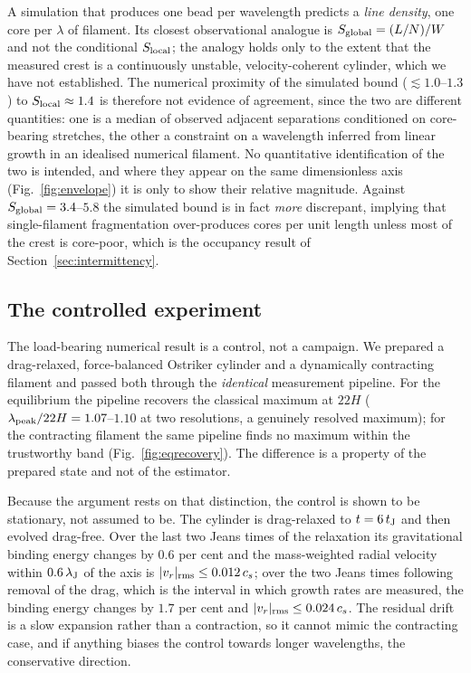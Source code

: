 \documentclass[usenatbib,twoside,twocolumn]{mnras}
\begin{document}
A simulation that produces one bead per wavelength predicts a \emph{line density}, one core per $\lambda$ of filament. Its closest observational analogue is $S_{\rm global}=(L/N)/W$ and not the conditional $S_{\rm local}$; the analogy holds only to the extent that the measured crest is a continuously unstable, velocity-coherent cylinder, which we have not established. The numerical proximity of the simulated bound ($\lesssim1.0$--$1.3$) to $S_{\rm local}\approx1.4$ is therefore not evidence of agreement, since the two are different quantities: one is a median of observed adjacent separations conditioned on core-bearing stretches, the other a constraint on a wavelength inferred from linear growth in an idealised numerical filament. No quantitative identification of the two is intended, and where they appear on the same dimensionless axis (Fig.~\ref{fig:envelope}) it is only to show their relative magnitude. Against $S_{\rm global}=3.4$--$5.8$ the simulated bound is in fact \emph{more} discrepant, implying that single-filament fragmentation over-produces cores per unit length unless most of the crest is core-poor, which is the occupancy result of Section~\ref{sec:intermittency}.

\subsection{The controlled experiment}
\label{sec:control}

The load-bearing numerical result is a control, not a campaign. We prepared a drag-relaxed, force-balanced Ostriker cylinder and a dynamically contracting filament and passed both through the \emph{identical} measurement pipeline. For the equilibrium the pipeline recovers the classical maximum at $22H$ ($\lambda_{\rm peak}/22H=1.07$--$1.10$ at two resolutions, a genuinely resolved maximum); for the contracting filament the same pipeline finds no maximum within the trustworthy band (Fig.~\ref{fig:eqrecovery}). The difference is a property of the prepared state and not of the estimator.

Because the argument rests on that distinction, the control is shown to be stationary, not assumed to be. The cylinder is drag-relaxed to $t=6\,t_{\rm J}$ and then evolved drag-free. Over the last two Jeans times of the relaxation its gravitational binding energy changes by $0.6$ per cent and the mass-weighted radial velocity within $0.6\,\lambda_{\rm J}$ of the axis is $|v_r|_{\rm rms}\leq0.012\,c_s$; over the two Jeans times following removal of the drag, which is the interval in which growth rates are measured, the binding energy changes by $1.7$ per cent and $|v_r|_{\rm rms}\leq0.024\,c_s$. The residual drift is a slow expansion rather than a contraction, so it cannot mimic the contracting case, and if anything biases the control towards longer wavelengths, the conservative direction.
\end{document}
